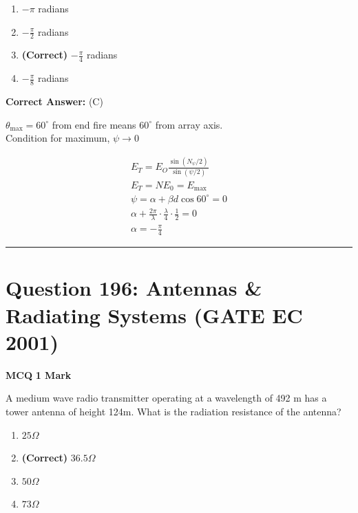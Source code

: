 \documentclass[11pt,a4paper]{article}
\begin{document}
\begin{enumerate}[label=(\Alph*)]
    \item $- \pi$ radians
    \item $-\frac{\pi }{2}$ radians
    \item \textbf{(Correct)} $-\frac{\pi }{4}$ radians
    \item $-\frac{\pi }{8}$ radians
\end{enumerate}

\noindent \textbf{Correct Answer:} (C)

\begin{tcolorbox}[solbox, title=Detailed Solution -- Question 195]
$\theta_{\max }=60^{\circ}$ from end fire means $60^{\circ}$ from array axis.\\ Condition for maximum, $\psi \rightarrow 0$

\[
\begin{array}{l} E_{T}=E_{O} \frac{\sin \left(N_{\psi} / 2\right)}{\sin (\psi / 2)} \\ E_{T}=N E_{0}=E_{\max } \\ \psi=\alpha+\beta d \cos 60^{\circ}=0 \\ \alpha+\frac{2 \pi}{\lambda} \cdot \frac{\lambda}{4} \cdot \frac{1}{2}=0 \\ \alpha=-\frac{\pi}{4} \end{array}
\]
\end{tcolorbox}

\vspace{1.5em}
\hrule
\vspace{1.5em}

\section*{Question 196: Antennas \& Radiating Systems (GATE EC 2001)}
\noindent \textbf{\color{primary}MCQ} \hfill \textbf{\color{secondary}1 Mark}


\noindent A medium wave radio transmitter operating at a wavelength of 492 m has a
tower antenna of height 124m. What is the radiation resistance of the antenna?


\begin{enumerate}[label=(\Alph*)]
    \item $25\Omega$
    \item \textbf{(Correct)} $36.5 \Omega$
    \item $50\Omega$
    \item $73 \Omega$
\end{enumerate}
\end{document}
